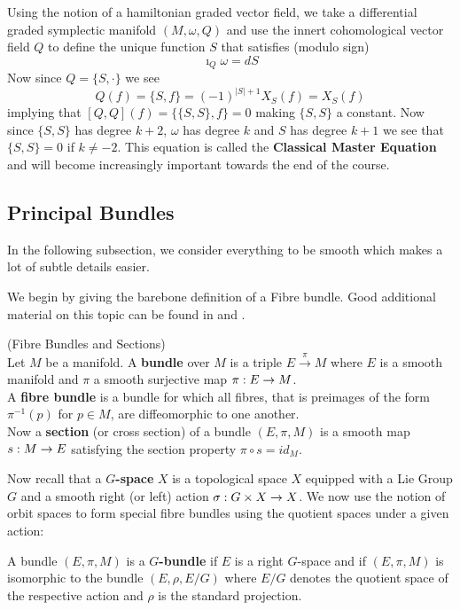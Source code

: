 Using the notion of a hamiltonian graded vector field, we take a differential graded symplectic manifold $(M,\omega, Q)$ and use the innert cohomological vector field $Q$ to define the unique function $S$ that satisfies (modulo sign)
$$ \imath_Q \omega = dS $$
Now since $Q = \{S,\cdot\}$ we see
$$ Q(f) = \{S, f\} = (-1)^{|S|+1} X_S(f) = X_S(f) $$
implying that $[Q,Q](f) = \{\{S,S\},f\} = 0$ making $\{S,S\}$ a constant. Now since $\{S,S\}$ has degree $k+2$, $\omega$ has degree $k$ and $S$ has degree $k+1$ we see that $\{S,S\} = 0$ if $k \neq -2$. This equation is called the \textbf{Classical Master Equation} and will become increasingly important towards the end of the course.

\newpage
\subsection{Principal Bundles}

\begin{rem}
  In the following subsection, we consider everything to be smooth which makes a lot of subtle details easier.
\end{rem}

We begin by giving the barebone definition of a Fibre bundle. Good additional material on this topic can be found in   and .

\begin{definition} (Fibre Bundles and Sections)\\
  Let $M$ be a manifold. A \textbf{bundle} over $M$ is a triple $E\overset{\pi}{\longrightarrow}M$ where $E$ is a smooth manifold and $\pi$ a smooth surjective map $\pi:E\rightarrow M$.\\
  A \textbf{fibre bundle} is a bundle for which all fibres, that is preimages of the form $\pi^{-1}(p)$ for $p\in M$, are diffeomorphic to one another.\\
  Now a \textbf{section} (or cross section) of a bundle $(E,\pi,M)$ is a smooth map $s:M\rightarrow E$ satisfying the section property $\pi \circ s = id_M$.
\end{definition}

Now recall that a \textbf{$G$-space} $X$ is a topological space $X$ equipped with a Lie Group $G$ and a smooth right (or left) action $\sigma:G\times X \rightarrow X$. We now use the notion of orbit spaces to form special fibre bundles using the quotient spaces under a given action:

\begin{definition}
  A bundle $(E,\pi,M)$ is a \textbf{$G$-bundle} if $E$ is a right $G$-space and if $(E,\pi,M)$ is isomorphic to the bundle $(E,\rho,E/G)$ where $E/G$ denotes the quotient space of the respective action and $\rho$ is the standard projection.
\end{definition}

